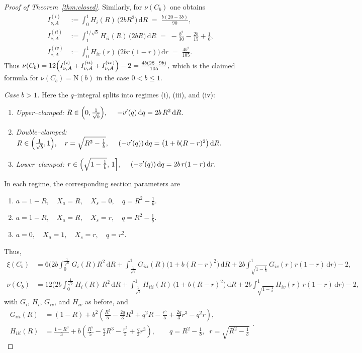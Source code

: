 \documentclass{article}
\newcommand{\1}{\mathds{1}}
\newcommand{\de}{\mathrm{\,d}}
\newcommand{\NN}{\mathrm{N}}
\begin{document}
\begin{proof}[Proof of Theorem~\ref{thm:closed}]
Similarly, for \(\nu(C_b)\) one obtains
\[
\begin{aligned}
I^{(i)}_{\nu,A}
&:=\int_{0}^{1} H_i(R)\,\bigl(2bR^2\bigr)\de R
   \;=\;\frac{b(20-3b)}{90},\\[2mm]
I^{(ii)}_{\nu,A}
&:=\int_{1}^{1/\sqrt b} H_{ii}(R)\,\bigl(2bR\bigr)\de R
   \;=\;-\frac{b^2}{30}-\frac{2b}{15}+\frac16,\\[2mm]
I^{(iv)}_{\nu,A}
&:=\int_{0}^{1} H_{iv}(r)\,\bigl(2br(1-r)\bigr)\de r
   \;=\;\frac{4b^2}{105}.
\end{aligned}
\]
Thus
\(
\nu(C_b)
=
12\Bigl(I^{(i)}_{\nu,A}+I^{(ii)}_{\nu,A}+I^{(iv)}_{\nu,A}\Bigr)-2
=
\frac{4b(28-9b)}{105},
\)
which is the claimed formula for \(\nu(C_b)=\NN(b)\) in the case \(0<b\le 1\).

\smallskip
\noindent\emph{Case \(b>1\).}
Here the \(q\)–integral splits into regimes (i), (iii), and (iv):
\begin{enumerate}[label=(\roman*)]
\item \emph{Upper–clamped:}
\(
R\in\Bigl(0,\tfrac{1}{\sqrt b}\Bigr),\quad
  -v'(q)\de q=2b\,R^{2}\de R.
\)
\item[(iii)] \emph{Double–clamped:}
\(
R\in\Bigl(\tfrac{1}{\sqrt b},1\Bigr),\quad r=\sqrt{R^2-\tfrac{1}{b}},\quad
  (-v'(q))\de q=\bigl(1+b(R-r)^2\bigr)\de R.
\)
\item[(iv)] \emph{Lower–clamped:}
\(
r\in\Bigl(\sqrt{1-\tfrac{1}{b}},\,1\Bigr],\quad
  (-v'(q))\de q=2b\,r(1-r)\de r.
\)
\end{enumerate}
\noindent
In each regime, the corresponding section parameters are
\begin{enumerate}[label=(\roman*)]
\item \(a = 1-R,\quad X_a = R,\quad X_s = 0,\quad q = R^{2}-\tfrac{1}{b}.\)
\item[(iii)] \(a = 1-R,\quad X_a = R,\quad X_s = r,\quad q = R^{2}-\tfrac{1}{b}.\)
\item[(iv)] \(a = 0,\quad X_a = 1,\quad X_s = r,\quad q = r^{2}.\)
\end{enumerate}
Thus,
\small
\[
\begin{aligned}
\xi(C_b)
&= 6\Bigg(
   2b\int_{0}^{\frac1{\sqrt b}} G_i(R)R^2\de R
 + \int_{\frac1{\sqrt b}}^{1} G_{iii}(R)\bigl(1+b(R-r)^2\bigr)\de R
 + 2b\int_{\sqrt{1-\frac1b}}^{1} G_{iv}(r)r(1-r)\de r
\Bigg) - 2,\\[4pt]
\nu(C_b)
&= 12\Bigg(
   2b\int_{0}^{\frac1{\sqrt b}} H_i(R)\,R^2\de R
 + \int_{\frac1{\sqrt b}}^{1} H_{iii}(R)\,\bigl(1+b(R-r)^2\bigr)\de R
 + 2b \int_{\sqrt{1-\frac1b}}^{1} H_{iv}(r)\,r(1-r)\de r
\Bigg) - 2,
\end{aligned}
\]
\normalsize
with $G_i$, $H_i$, $G_{iv}$, and $H_{iv}$ as before, and
\[
\begin{aligned}
G_{iii}(R)&=(1-R)+b^2\!\left(\frac{R^5}{5}-\frac{2q}{3}R^3+q^2R - \frac{r^5}{5}+\frac{2q}{3}r^3-q^2r\right),\\
H_{iii}(R)&=\frac{1-R^3}{3}+b\!\left(\frac{R^5}{5}-\frac{q}{3}R^3 - \frac{r^5}{5}+\frac{q}{3}r^3\right),
\qquad q=R^2-\tfrac{1}{b},\;\; r=\sqrt{R^2-\tfrac{1}{b}}
\end{aligned}
.\]


\end{proof}
\end{document}
